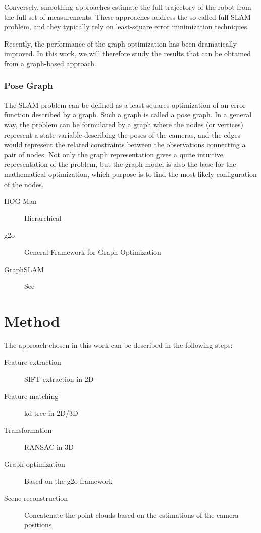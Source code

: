 \documentclass[a4paper,11pt]{kth-mag}
\begin{document}
Conversely, smoothing approaches estimate the full trajectory of the robot from the full set of measurements. These approaches address the so-called full SLAM problem, and they typically rely on least-square error minimization techniques.

Recently, the performance of the graph optimization has been dramatically improved. In this work, we will therefore study the results that can be obtained from a graph-based approach.

\subsection{Pose Graph}

The SLAM problem can be defined as a least squares optimization of an error function described by a graph. Such a graph is called a pose graph. In a general way, the problem can be formulated by a graph where the nodes (or vertices) represent a state variable describing the poses of the cameras, and the edges would represent the related constraints between the observations connecting a pair of nodes. Not only the graph representation gives a quite intuitive representation of the problem, but the graph model is also the base for the mathematical optimization, which purpose is to find the most-likely configuration of the nodes.

\begin{description}
\item[HOG-Man] Hierarchical
\item[g2o] General Framework for Graph Optimization
\item[GraphSLAM] See ~\cite{Thrun2005}
\end{description}

\chapter{Method}

The approach chosen in this work can be described in the following steps:
\begin{description}
\item[Feature extraction] SIFT extraction in 2D
\item[Feature matching] kd-tree in 2D/3D
\item[Transformation] RANSAC in 3D
\item[Graph optimization] Based on the g2o framework
\item[Scene reconstruction] Concatenate the point clouds based on the estimations of the camera positions
\end{description}
\end{document}
